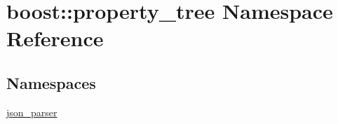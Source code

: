 \hypertarget{namespaceboost_1_1property__tree}{}\section{boost\+:\+:property\+\_\+tree Namespace Reference}
\label{namespaceboost_1_1property__tree}
\subsection*{Namespaces}
\begin{DoxyCompactItemize}
\item 
 \hyperlink{namespaceboost_1_1property__tree_1_1json__parser}{json\+\_\+parser}
\end{DoxyCompactItemize}
